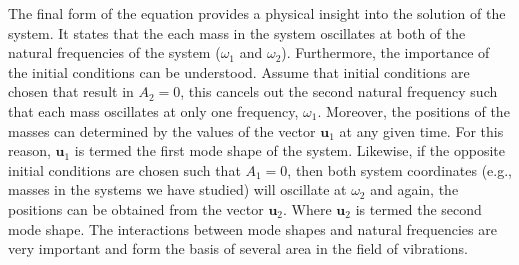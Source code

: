 \documentclass[12pt,letter]{article}
\numberwithin{ex}{section} %
\numberwithin{re}{section} %
\begin{document}
The final form of the equation provides a physical insight into the solution of the system. It states that the each mass in the system oscillates at both of the natural frequencies of the system ($\omega_1$ and $\omega_2$). Furthermore, the importance of the  initial conditions can be understood. Assume that initial conditions are chosen that result in $A_2=0$, this cancels out the second natural frequency such that each mass oscillates at only one frequency,  $\omega_1$. Moreover, the positions of the masses can determined by the values of the vector $\mathbf{u}_1$ at any given time. For this reason,  $\mathbf{u}_1$ is termed the first mode shape of the system. Likewise, if the opposite initial conditions are chosen such that  $A_1=0$, then both system coordinates (e.g., masses in the systems we have studied) will oscillate at $\omega_2$ and again, the positions can be obtained from the vector $\mathbf{u}_2$. Where $\mathbf{u}_2$ is termed the second mode shape. The interactions between mode shapes and natural frequencies are very important and form the basis of several area in the field of vibrations.
\end{document}
